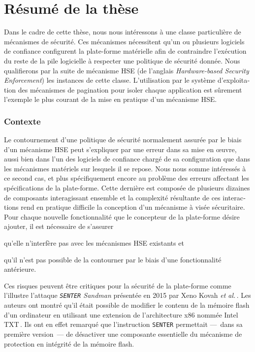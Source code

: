 \chapter{Résumé de la thèse}

\begin{otherlanguage}{french}
  Dans le cadre de cette thèse, nous nous intéressons à une classe particulière
  de mécanismes de sécurité. Ces mécanismes nécessitent qu'un ou plusieurs logiciels de confiance configurent la plate-forme matérielle afin de contraindre l’exécution du reste de la pile logicielle à
  respecter une politique de sécurité donnée.
  Nous qualifierons par la suite de mécanisme HSE (de l’anglais
  \emph{Hardware-based Security Enforcement}) les instances de cette
  classe.
  L’utilisation par le système d’exploitation des mécanismes de pagination pour
  isoler chaque application est sûrement l’exemple le plus courant de la mise en
  pratique d’un mécanisme HSE.

  \subsection*{Contexte}

  Le contournement d’une politique de sécurité normalement assurée par le biais
  d’un mécanisme HSE peut s’expliquer par une erreur dans sa mise en œuvre, aussi
  bien dans l’un des logiciels de confiance chargé de sa configuration que dans les mécanismes matériels sur  lesquels il se repose.
 Nous nous somme intéressés à ce second cas, et
  plus spécifiquement encore au problème des erreurs affectant les
  spécifications de la plate-forme.
  Cette dernière est composée de plusieurs dizaines de composants interagissant
  ensemble et la complexité résultante de ces interactions rend en pratique
  difficile la conception d’un mécanisme à visée sécuritaire.
  Pour chaque nouvelle fonctionnalité que le concepteur de la plate-forme désire
  ajouter, il est nécessaire de s’assurer
  \begin{inparaenum}[(1)]
  \item qu’elle n’interfère pas avec les mécanismes HSE existants et
  \item qu'il n'est pas possible de la contourner par le biais d’une fonctionnalité
    antérieure.
  \end{inparaenum}
  Ces risques peuvent être critiques pour la sécurité de la plate-forme comme l'illustre l’attaque \emph{\texttt{SENTER} Sandman}
  présentée en 2015 par Xeno Kovah \emph{et al.}\,\cite{kovah2015senter}.
  Les auteurs ont montré qu’il était possible de modifier le contenu de la
  mémoire flash d’un ordinateur en utilisant une extension de l’architecture x86
  nommée Intel TXT\,\cite{intel2015txt}.
  Ils ont en effet remarqué que l’instruction \texttt{SENTER} permettait
  ---~dans sa première version~--- de désactiver une composante essentielle du
  mécanisme de protection en intégrité de la mémoire flash.


\end{otherlanguage}
